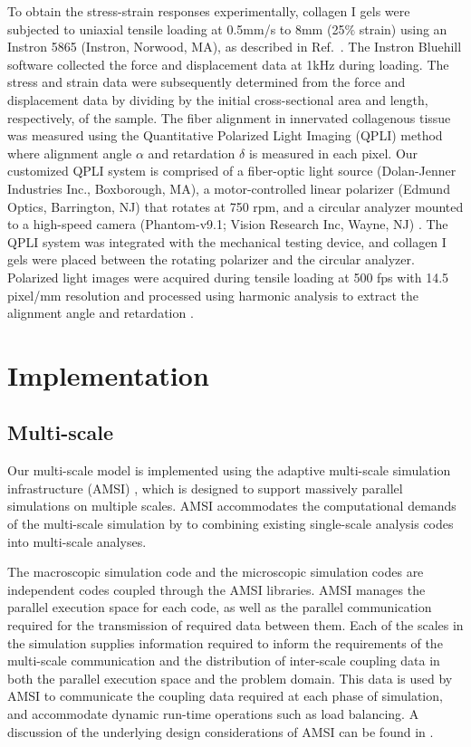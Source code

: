 \documentclass[]{interact}
\begin{document}
To obtain the stress-strain responses experimentally, collagen I gels were subjected to uniaxial tensile loading at 0.5mm/s to 8mm (25$\%$ strain) using an Instron 5865 (Instron, Norwood, MA), as described in Ref.\ . The Instron Bluehill software collected the force and displacement data at 1kHz during loading. The stress and strain data were subsequently determined from the force and displacement data by dividing by the initial cross-sectional area and length, respectively, of the sample. The fiber alignment in innervated collagenous tissue was measured using the Quantitative Polarized Light Imaging (QPLI) method \citep{Quinn:2008df,Quinn:2009bf} where alignment angle $\alpha$ and retardation $\delta$ is measured in each pixel. Our customized QPLI system \citep{Zhang:2016ga} is comprised of a fiber-optic light source (Dolan-Jenner Industries Inc., Boxborough, MA), a motor-controlled linear polarizer (Edmund Optics, Barrington, NJ) that rotates at 750 rpm, and a circular analyzer mounted to a high-speed camera (Phantom-v9.1; Vision Research Inc, Wayne, NJ) \citep{Zhang:2016ga}. The QPLI system was integrated with the mechanical testing device, and collagen I gels were placed between the rotating polarizer and the circular analyzer. Polarized light images were acquired during tensile loading at 500 fps with 14.5 pixel/mm resolution and processed using harmonic analysis to extract the alignment angle and retardation \citep{Tower:2002hk,Quinn:2008df}.

\section{Implementation}
\label{sec:implementation}

\subsection{Multi-scale}
Our multi-scale model is implemented using the adaptive multi-scale simulation infrastructure (AMSI) \citep{Tobin:2017ip}, which is designed to support massively parallel simulations on multiple scales. AMSI accommodates the computational demands of the multi-scale simulation by to combining existing single-scale analysis codes into multi-scale analyses.

The macroscopic simulation code and the microscopic simulation codes are independent codes coupled through the AMSI libraries. AMSI manages the parallel execution space for each code, as well as the parallel communication required for the transmission of required data between them. Each of the scales in the simulation supplies information required to inform the requirements of the multi-scale communication and the distribution of inter-scale coupling data in both the parallel execution space and the problem domain. This data is used by AMSI to communicate the coupling data required at each phase of simulation, and accommodate dynamic run-time operations such as load balancing. A discussion of the underlying design considerations of AMSI can be found in \citep{Delalondre:2010kt}.
\end{document}
